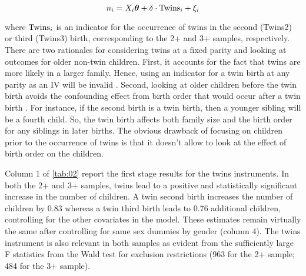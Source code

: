 \begin{equation}\label{eq:02}
	n_{i} = X_{i}\boldsymbol{\theta} + \delta\cdot {\rm Twins }_{i} + \xi_{i}
\end{equation}

where $ {\rm Twins }_{i} $ is an indicator for the occurrence of twins in the second (Twins2) or third (Twins3) birth, corresponding to the 2+ and 3+ samples, respectively. There are two rationales for considering twins at a fixed parity and looking at outcomes for older non-twin children. First, it accounts for the fact that twins are more likely in a larger family. Hence, using an indicator for a twin birth at any parity as an IV will be invalid \parencite{oberg_casual_2021}. Second, looking at older children before the twin birth avoids the confounding effect from birth order that would occur after a twin birth \parencite{Black2010}. For instance, if the second birth is a twin birth, then a younger sibling will be a fourth child. So, the twin birth affects both family size and the birth order for any siblings in later births. The obvious drawback of focusing on children prior to the occurrence of twins is that it doesn't allow to look at the effect of birth order on the children.  

Column 1 of \autoref{tab:02} report the first stage results for the twins instruments. In both the 2+ and 3+ samples, twins lead to a positive and statistically significant increase in the number of children. A twin second birth increases the number of children by 0.83 whereas a twin third birth leads to 0.76 additional children, controlling for the other covariates in the model. These estimates remain virtually the same after controlling for same sex dummies by gender (column 4).  The twins instrument is also relevant in both samples as evident from the sufficiently large F statistics from the Wald test for exclusion restrictions (963 for the 2+ sample; 484 for the 3+ sample). 

